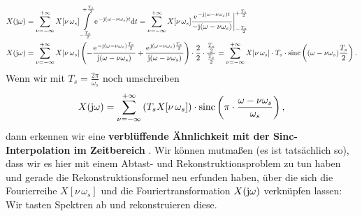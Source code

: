 \begin{align}
&X(\im\omega) = \sum_{\nu=-\infty}^{+\infty} X[\nu\,\omega_s]
\int\limits_{-\frac{T_s}{2}}^{+\frac{T_s}{2}}
\e^{-\im (\omega-\nu\omega_s) t} \fsd t=
\sum_{\nu=-\infty}^{+\infty} X[\nu\,\omega_s]
\frac{\e^{-\im (\omega-\nu\omega_s) t}}{-\im (\omega-\nu\omega_s)}
\bigg|_{-\frac{T_s}{2}}^{+\frac{T_s}{2}}\\
&X(\im\omega) = \sum_{\nu=-\infty}^{+\infty} X[\nu\,\omega_s]\left(
-\frac{\e^{-\im (\omega-\nu\omega_s)\frac{T_s}{2}}}{\im (\omega-\nu\omega_s)}+
\frac{\e^{\im (\omega-\nu\omega_s)\frac{T_s}{2}}}{\im (\omega-\nu\omega_s)}\right)
\cdot \frac{2}{2} \cdot \frac{\frac{T_s}{2}}{\frac{T_s}{2}} =
\sum_{\nu=-\infty}^{+\infty} X[\nu\,\omega_s] \cdot T_s \cdot
\mathrm{sinc}\left((\omega-\nu\omega_s)\frac{T_s}{2}\right).
\end{align}
Wenn wir mit $T_s=\frac{2\pi}{\omega_s}$ noch umschreiben
\begin{align}
\label{eq:SamplingFreqSincInterp}
X(\im\omega) = \sum_{\nu=-\infty}^{+\infty} \left(T_s X[\nu\,\omega_s]\right) \cdot
\mathrm{sinc}\left(\pi\cdot\frac{\omega-\nu\omega_s}{\omega_s}\right),
\end{align}
dann erkennen wir eine \textbf{verblüffende Ähnlichkeit mit der Sinc-Interpolation
im Zeitbereich} .
%
Wir können mutmaßen (es ist tatsächlich so), dass wir es hier mit einem
Abtast- und Rekonstruktionsproblem zu tun haben und gerade die Rekonstruktionsformel
neu erfunden haben, über die sich die Fourierreihe $X[\nu\,\omega_s]$
und die Fouriertransformation $X(\im\omega)$
verknüpfen lassen: Wir tasten Spektren ab und rekonstruieren diese.


